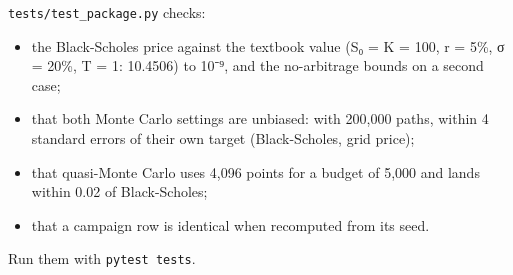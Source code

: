 \documentclass[
  10pt,
]{article}
\providecommand{\tightlist}{%
  \setlength{\itemsep}{0pt}\setlength{\parskip}{0pt}}
\begin{document}
\texttt{tests/test\_package.py} checks:

\begin{itemize}
\tightlist
\item
  the Black-Scholes price against the textbook value (S₀ = K = 100, r =
  5\%, σ = 20\%, T = 1: 10.4506) to 10⁻⁹, and the no-arbitrage bounds on
  a second case;
\item
  that both Monte Carlo settings are unbiased: with 200,000 paths,
  within 4 standard errors of their own target (Black-Scholes, grid
  price);
\item
  that quasi-Monte Carlo uses 4,096 points for a budget of 5,000 and
  lands within 0.02 of Black-Scholes;
\item
  that a campaign row is identical when recomputed from its seed.
\end{itemize}

Run them with \texttt{pytest\ tests}.
\end{document}
